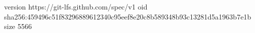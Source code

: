 version https://git-lfs.github.com/spec/v1
oid sha256:459496c51f83296889612340c95eef8e20c8b589348b93c13281d5a1963b7e1b
size 5566
